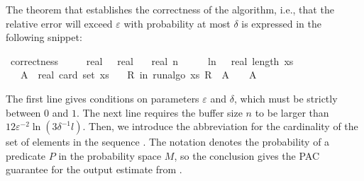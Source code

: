 
The theorem that establishes the correctness of the algorithm, i.e., that the relative error will exceed $\varepsilon$ with probability at most $\delta$ is expressed in the following snippet:
\begin{isabelle_cm}
\isamarkupfalse%
\ correctness{\isacharcolon}{\kern0pt}\isanewline
\ \ \ {\isacartoucheopen}{\isasymepsilon}\ {\isasymin}\ {\isacharbraceleft}{\kern0pt}{}{\isacharless}{\kern0pt}{\isachardot}{\kern0pt}{\isachardot}{\kern0pt}{\isacharless}{\kern0pt}{}{\isacharcolon}{\kern0pt}{\isacharcolon}{\kern0pt}real{\isacharbraceright}{\kern0pt}{\isacartoucheclose}\ {\isacartoucheopen}{\isasymdelta}\ {\isasymin}\ {\isacharbraceleft}{\kern0pt}{}{\isacharless}{\kern0pt}{\isachardot}{\kern0pt}{\isachardot}{\kern0pt}{\isacharless}{\kern0pt}{}{\isacharcolon}{\kern0pt}{\isacharcolon}{\kern0pt}real{\isacharbraceright}{\kern0pt}{\isacartoucheclose}\isanewline
\ \ \ {\isacartoucheopen}real\ n\ {\isasymge}\ {}{}\ {\isacharslash}{\kern0pt}\ {\isasymepsilon}\ {\isacharasterisk}{\kern0pt}\ ln\ {\isacharparenleft}{\kern0pt}{}\ {\isacharasterisk}{\kern0pt}\ real\ {\isacharparenleft}{\kern0pt}length\ xs{\isacharparenright}{\kern0pt}\ {\isacharslash}{\kern0pt}\ {\isasymdelta}{\isacharparenright}{\kern0pt}{\isacartoucheclose}\isanewline
\ \ \ {\isacartoucheopen}A\ {\isasymequiv}\ real\ {\isacharparenleft}{\kern0pt}card\ {\isacharparenleft}{\kern0pt}set\ xs{\isacharparenright}{\kern0pt}{\isacharparenright}{\kern0pt}{\isacartoucheclose}\isanewline
\ \ \ {\isacartoucheopen}{\isasymP}{\isacharparenleft}{\kern0pt}R\ in\ run{\isacharunderscore}{\kern0pt}algo\ xs{\isachardot}{\kern0pt}\ {\isasymbar}R\ {\isacharminus}{\kern0pt}\ A{\isasymbar}\ {\isachargreater}{\kern0pt}\ {\isasymepsilon}\ {\isacharasterisk}{\kern0pt}\ A{\isacharparenright}{\kern0pt}\ {\isasymle}\ {\isasymdelta}{\isacartoucheclose}
\end{isabelle_cm}
The first line gives conditions on parameters $\varepsilon$ and $\delta$, which must be strictly between $0$ and $1$.
The next line requires the buffer size $n$ to be larger than $12 \varepsilon^{-2} \ln ( 3 \delta^{-1} l)$.
Then, we introduce the abbreviation  for the cardinality of the set of elements in the sequence .
The notation  denotes the probability of a predicate $P$ in the probability space $M$, so the conclusion gives the PAC guarantee for the output estimate  from .

